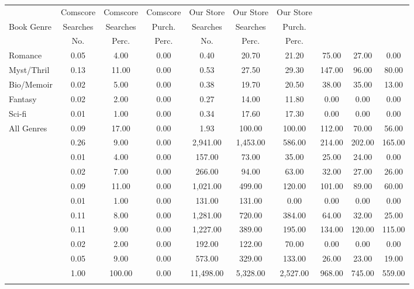 \begin{center}
\begin{tabular}{lccccccccc}
\hline \noalign{\smallskip} & Comscore & Comscore & Comscore & Our Store & Our Store & Our Store &  &  & \\
Book Genre & Searches & Searches & Purch. & Searches & Searches & Purch. &  &  & \\
 & No. & Perc. & Perc. & No. & Perc. & Perc. &  &  & \\
\noalign{\smallskip}\hline \noalign{\smallskip}Romance & 0.05 & 4.00 & 0.00 & 0.40 & 20.70 & 21.20 & 75.00 & 27.00 & 0.00\\
Myst/Thril & 0.13 & 11.00 & 0.00 & 0.53 & 27.50 & 29.30 & 147.00 & 96.00 & 80.00\\
Bio/Memoir & 0.02 & 5.00 & 0.00 & 0.38 & 19.70 & 20.50 & 38.00 & 35.00 & 13.00\\
Fantasy & 0.02 & 2.00 & 0.00 & 0.27 & 14.00 & 11.80 & 0.00 & 0.00 & 0.00\\
Sci-fi & 0.01 & 1.00 & 0.00 & 0.34 & 17.60 & 17.30 & 0.00 & 0.00 & 0.00\\
All Genres & 0.09 & 17.00 & 0.00 & 1.93 & 100.00 & 100.00 & 112.00 & 70.00 & 56.00\\
 & 0.26 & 9.00 & 0.00 & 2,941.00 & 1,453.00 & 586.00 & 214.00 & 202.00 & 165.00\\
 & 0.01 & 4.00 & 0.00 & 157.00 & 73.00 & 35.00 & 25.00 & 24.00 & 0.00\\
 & 0.02 & 7.00 & 0.00 & 266.00 & 94.00 & 63.00 & 32.00 & 27.00 & 26.00\\
 & 0.09 & 11.00 & 0.00 & 1,021.00 & 499.00 & 120.00 & 101.00 & 89.00 & 60.00\\
 & 0.01 & 1.00 & 0.00 & 131.00 & 131.00 & 0.00 & 0.00 & 0.00 & 0.00\\
 & 0.11 & 8.00 & 0.00 & 1,281.00 & 720.00 & 384.00 & 64.00 & 32.00 & 25.00\\
 & 0.11 & 9.00 & 0.00 & 1,227.00 & 389.00 & 195.00 & 134.00 & 120.00 & 115.00\\
 & 0.02 & 2.00 & 0.00 & 192.00 & 122.00 & 70.00 & 0.00 & 0.00 & 0.00\\
 & 0.05 & 9.00 & 0.00 & 573.00 & 329.00 & 133.00 & 26.00 & 23.00 & 19.00\\
 & 1.00 & 100.00 & 0.00 & 11,498.00 & 5,328.00 & 2,527.00 & 968.00 & 745.00 & 559.00\\
\noalign{\smallskip}\hline\end{tabular}\\
\end{center}
